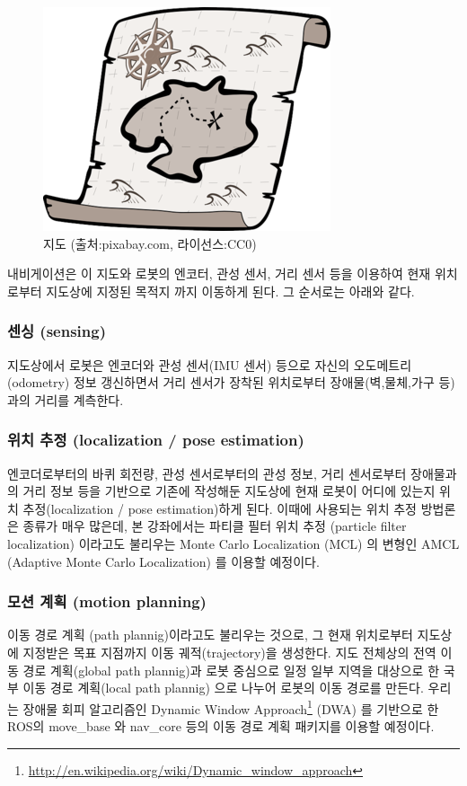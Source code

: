 \begin{figure}[h]
\centering
\includegraphics[width=0.5\columnwidth]{pictures/chapter11/treasure_map.png}
\caption{지도 (출처:pixabay.com, 라이선스:CC0)}
\end{figure}

내비게이션은 이 지도와 로봇의 엔코터, 관성 센서, 거리 센서 등을 이용하여 현재 위치로부터 지도상에 지정된 목적지 까지 이동하게 된다. 그 순서로는 아래와 같다.

\subsubsection{센싱 (sensing)}
지도상에서 로봇은 엔코더와 관성 센서(IMU 센서) 등으로 자신의 오도메트리(odometry) 정보 갱신하면서 거리 센서가 장착된 위치로부터 장애물(벽,물체,가구 등)과의 거리를 계측한다. 

\subsubsection{위치 추정 (localization / pose estimation)}
엔코더로부터의 바퀴 회전량, 관성 센서로부터의 관성 정보, 거리 센서로부터 장애물과의 거리 정보 등을 기반으로 기존에 작성해둔 지도상에 현재 로봇이 어디에 있는지 위치 추정(localization / pose estimation)하게 된다. 이때에 사용되는 위치 추정 방법론은 종류가 매우 많은데, 본 강좌에서는 파티클 필터 위치 추정 (particle filter localization) 이라고도 불리우는 Monte Carlo Localization (MCL) 의 변형인 AMCL (Adaptive Monte Carlo Localization)\cite{thrun2005probabilistic} 를 이용할 예정이다.

\subsubsection{모션 계획 (motion planning)}
이동 경로 계획 (path plannig)이라고도 불리우는 것으로, 그 현재 위치로부터 지도상에 지정받은 목표 지점까지 이동 궤적(trajectory)을 생성한다. 지도 전체상의 전역 이동 경로 계획(global path plannig)과 로봇 중심으로 일정 일부 지역을 대상으로 한 국부 이동 경로 계획(local path plannig) 으로 나누어 로봇의 이동 경로를 만든다. 우리는 장애물 회피 알고리즘인 Dynamic Window Approach\footnote{\url{http://en.wikipedia.org/wiki/Dynamic_window_approach}} (DWA) 를 기반으로 한 ROS의 move\_base 와 nav\_core 등의 이동 경로 계획 패키지를 이용할 예정이다.

